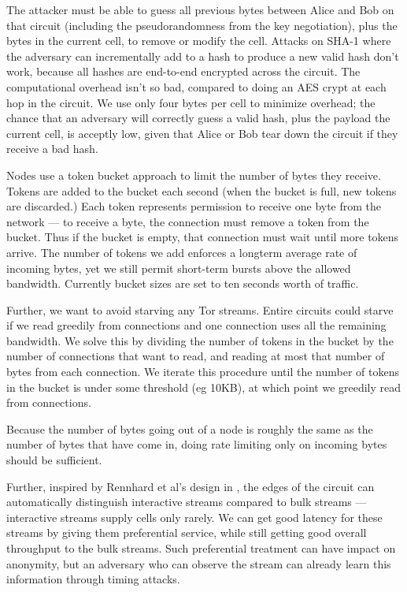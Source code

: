\documentclass[times,10pt,twocolumn]{article}
\begin{document}
The attacker must be able to guess all previous bytes between Alice
and Bob on that circuit (including the pseudorandomness from the key
negotiation), plus the bytes in the current cell, to remove or modify the
cell. Attacks on SHA-1 where the adversary can incrementally add to a
hash to produce a new valid hash \cite{practical-crypto} don't work,
because all hashes are end-to-end encrypted across the circuit.
The computational overhead isn't so bad, compared to doing an AES
crypt at each hop in the circuit. We use only four bytes per cell to
minimize overhead; the chance that an adversary will correctly guess a
valid hash, plus the payload the current cell, is acceptly low, given
that Alice or Bob tear down the circuit if they receive a bad hash.


Nodes use a token bucket approach \cite{foo} to limit the number of
bytes they receive. Tokens are added to the bucket each second (when
the bucket is full, new tokens are discarded.) Each token represents
permission to receive one byte from the network --- to receive a byte,
the connection must remove a token from the bucket. Thus if the bucket
is empty, that connection must wait until more tokens arrive. The number
of tokens we add enforces a longterm average rate of incoming bytes, yet
we still permit short-term bursts above the allowed bandwidth. Currently
bucket sizes are set to ten seconds worth of traffic.

Further, we want to avoid starving any Tor streams. Entire circuits
could starve if we read greedily from connections and one connection
uses all the remaining bandwidth. We solve this by dividing the number
of tokens in the bucket by the number of connections that want to read,
and reading at most that number of bytes from each connection. We iterate
this procedure until the number of tokens in the bucket is under some
threshold (eg 10KB), at which point we greedily read from connections.

Because the number of bytes going out of a node is roughly the same
as the number of bytes that have come in, doing rate limiting only on
incoming bytes should be sufficient.

Further, inspired by Rennhard et al's design in \cite{anonnet}, the edges
of the circuit can automatically distinguish interactive streams compared
to bulk streams --- interactive streams supply cells only rarely. We can
get good latency for these streams by giving them preferential service,
while still getting good overall throughput to the bulk streams. Such
preferential treatment can have impact on anonymity, but an adversary
who can observe the stream can already learn this information through
timing attacks.
\end{document}
